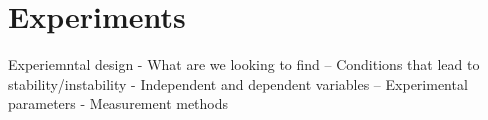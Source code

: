 \chapter{Experiments}\label{experiments}

Experiemntal design
- What are we looking to find
-- Conditions that lead to stability/instability
- Independent and dependent variables
-- Experimental parameters
- Measurement methods
